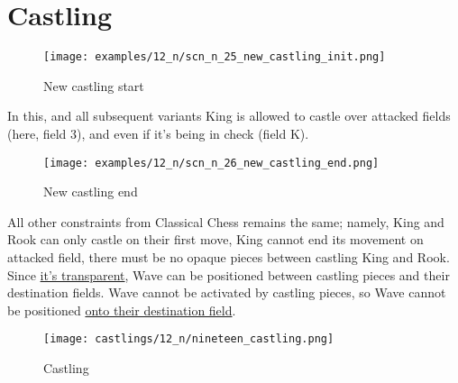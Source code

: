 \clearpage %

\section*{Castling}
\label{sec:Nineteen/Castling}

\vspace*{-1.7\baselineskip}
\noindent
\begin{figure}[!h]
\texttt{[image: examples/12\_n/scn\_n\_25\_new\_castling\_init.png]}
\vspace*{-1.4\baselineskip}
\caption{New castling start}
\label{fig:scn_n_25_new_castling_init}
\end{figure}

\vspace*{-0.7\baselineskip}
In this, and all subsequent variants King is allowed to castle over attacked fields
(here, field 3), and even if it's being in check (field K).

\vspace*{-0.7\baselineskip}
\noindent
\begin{figure}[!h]
\texttt{[image: examples/12\_n/scn\_n\_26\_new\_castling\_end.png]}
\vspace*{-1.4\baselineskip}
\caption{New castling end}
\label{fig:scn_n_26_new_castling_end}
\end{figure}

\vspace*{-0.7\baselineskip}
All other constraints from Classical Chess remains the same; namely, King and Rook
can only castle on their first move, King cannot end its movement on attacked field,
there must be no opaque pieces between castling King and Rook. %
Since \hyperref[fig:scn_mv_07_wave_is_transparent]{it's transparent}, Wave can be
positioned between castling pieces and their destination fields.
Wave cannot be activated by castling pieces, so Wave cannot be positioned
\hyperref[fig:scn_mv_11_wave_block_castling_rook]{onto their destination field}.

\vspace*{-0.7\baselineskip}
\noindent
\begin{figure}[!h]
\texttt{[image: castlings/12\_n/nineteen\_castling.png]}
\vspace*{-1.4\baselineskip}
\caption{Castling}
\label{fig:nineteen_castling}
\end{figure}

